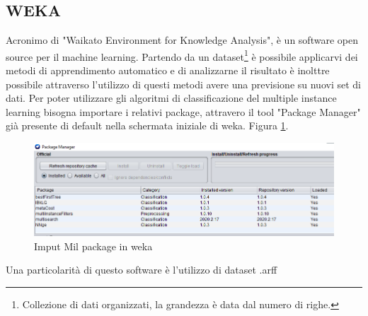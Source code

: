 \subsection{WEKA}
Acronimo di "Waikato Environment for Knowledge Analysis", è un software open source per il machine learning. Partendo da un dataset\footnote{Collezione di dati organizzati, la grandezza è data dal numero di righe.} è possibile applicarvi dei metodi di apprendimento automatico e di analizzarne il risultato è inolttre possibile attraverso l'utilizzo di questi metodi avere una previsione su nuovi set di dati. Per poter utilizzare gli algoritmi di classificazione del multiple instance learning bisogna importare i relativi package, attravero il tool "Package Manager" già presente di default nella schermata iniziale di weka. Figura \ref{fig:mil pckg}.
\begin{figure}[h]
\centering
    \includegraphics[width=0.9\linewidth]{imgs/capitolo4/packmil.png} 
    \caption{Imput Mil package in weka}
    \label{fig:mil pckg}
\end{figure}
\FloatBarrier
Una particolarità di questo software è l'utilizzo di dataset .arff 


